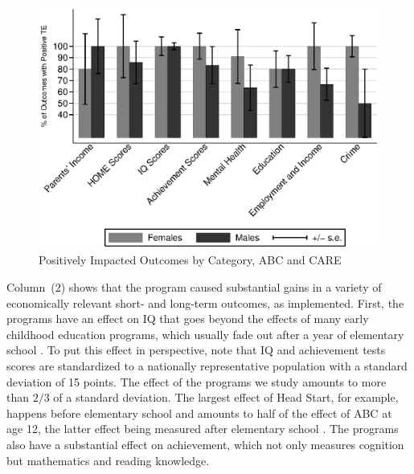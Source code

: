 \begin{figure}[H]
		\caption{Positively Impacted Outcomes by Category, ABC and CARE} \label{fig:ppositivecategory1}
		\includegraphics[width=.8\columnwidth]{output/itt_noctrl_cats1.eps}
\end{figure}

\noindent Column~(2) shows that the program caused substantial gains in a variety of economically relevant short- and long-term outcomes, as implemented. First, the programs have an effect on IQ that goes beyond the effects of many early childhood education programs, which usually fade out after a year of elementary school \citep{Hojman_2015_EvidenceFadeOut,Elango_Hojman_etal_2016_Early-Edu}. To put this effect in perspective, note that IQ and achievement tests scores are standardized to a nationally representative population with a standard deviation of 15 points. The effect of the programs we study amounts to more than $2/3$ of a standard deviation. The largest effect of Head Start, for example, happens before elementary school and amounts to half of the effect of ABC at age 12, the latter effect being measured after elementary school \citep{Elango_Hojman_etal_2016_Early-Edu}. The programs also have a substantial effect on achievement, which not only measures cognition but mathematics and reading knowledge.

